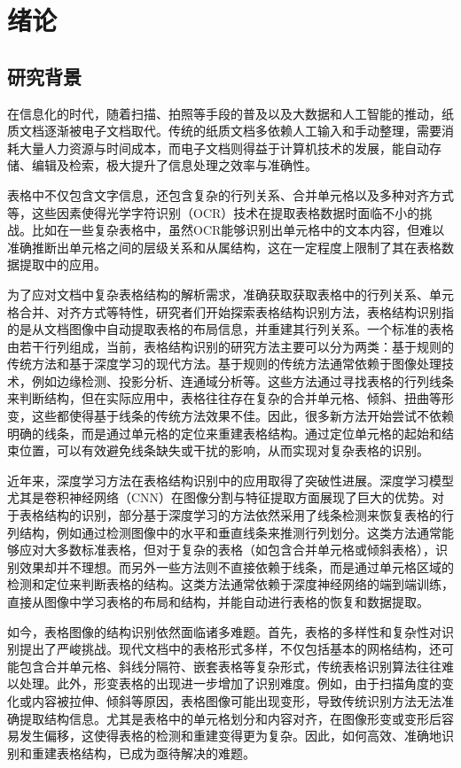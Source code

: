 \documentclass[../article.tex]{subfiles} %
\begin{document}
\section{绪论}
\subsection{研究背景}

在信息化的时代，随着扫描、拍照等手段的普及以及大数据和人工智能的推动，纸质文档逐渐被电子文档取代。传统的纸质文档多依赖人工输入和手动整理，需要消耗大量人力资源与时间成本，而电子文档则得益于计算机技术的发展，能自动存储、编辑及检索，极大提升了信息处理之效率与准确性。

表格中不仅包含文字信息，还包含复杂的行列关系、合并单元格以及多种对齐方式等，这些因素使得光学字符识别（OCR）技术在提取表格数据时面临不小的挑战。比如在一些复杂表格中，虽然OCR能够识别出单元格中的文本内容，但难以准确推断出单元格之间的层级关系和从属结构，这在一定程度上限制了其在表格数据提取中的应用。

为了应对文档中复杂表格结构的解析需求，准确获取获取表格中的行列关系、单元格合并、对齐方式等特性，研究者们开始探索表格结构识别方法，表格结构识别指的是从文档图像中自动提取表格的布局信息，并重建其行列关系。一个标准的表格由若干行列组成，当前，表格结构识别的研究方法主要可以分为两类：基于规则的传统方法和基于深度学习的现代方法。基于规则的传统方法通常依赖于图像处理技术，例如边缘检测、投影分析、连通域分析等。这些方法通过寻找表格的行列线条来判断结构，但在实际应用中，表格往往存在复杂的合并单元格、倾斜、扭曲等形变，这些都使得基于线条的传统方法效果不佳。因此，很多新方法开始尝试不依赖明确的线条，而是通过单元格的定位来重建表格结构。通过定位单元格的起始和结束位置，可以有效避免线条缺失或干扰的影响，从而实现对复杂表格的识别。

近年来，深度学习方法在表格结构识别中的应用取得了突破性进展。深度学习模型尤其是卷积神经网络（CNN）在图像分割与特征提取方面展现了巨大的优势。对于表格结构的识别，部分基于深度学习的方法依然采用了线条检测来恢复表格的行列结构，例如通过检测图像中的水平和垂直线条来推测行列划分。这类方法通常能够应对大多数标准表格，但对于复杂的表格（如包含合并单元格或倾斜表格），识别效果却并不理想。而另外一些方法则不直接依赖于线条，而是通过单元格区域的检测和定位来判断表格的结构。这类方法通常依赖于深度神经网络的端到端训练，直接从图像中学习表格的布局和结构，并能自动进行表格的恢复和数据提取。

如今，表格图像的结构识别依然面临诸多难题。首先，表格的多样性和复杂性对识别提出了严峻挑战。现代文档中的表格形式多样，不仅包括基本的网格结构，还可能包含合并单元格、斜线分隔符、嵌套表格等复杂形式，传统表格识别算法往往难以处理。此外，形变表格的出现进一步增加了识别难度。例如，由于扫描角度的变化或内容被拉伸、倾斜等原因，表格图像可能出现变形，导致传统识别方法无法准确提取结构信息。尤其是表格中的单元格划分和内容对齐，在图像形变或变形后容易发生偏移，这使得表格的检测和重建变得更为复杂。因此，如何高效、准确地识别和重建表格结构，已成为亟待解决的难题。
\end{document}

